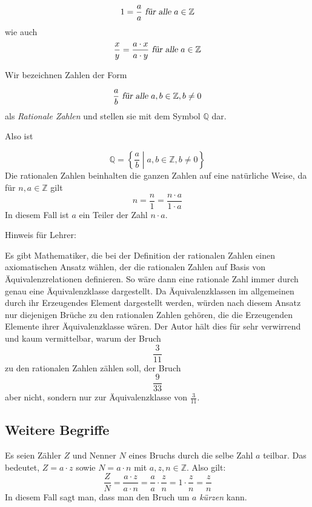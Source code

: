 \[ 1 = \frac{a}{a} \textsl{ für alle } a\in \mathbb{Z} \]
wie auch 
\begin{equation}
\label{relation}
\frac{x}{y} = \frac{a\cdot x}{a\cdot y} \textsl{ für alle } a\in \mathbb{Z}
\end{equation}

\begin{definition}
Wir bezeichnen Zahlen der Form 

\[ \frac{a}{b} \textsl{ für alle } a,b \in \mathbb{Z}, b\ne 0\]
als \emph{Rationale Zahlen} und stellen sie mit dem Symbol $\mathbb{Q}$ dar. 
\end{definition}
Also ist 

\[ \mathbb{Q} = \left\{ \frac{a}{b} \middle\vert a,b \in \mathbb{Z}, b\ne 0 \right\} \]
Die rationalen Zahlen beinhalten die ganzen Zahlen auf eine natürliche Weise, da für $n,a\in \mathbb{Z}$ gilt
\[ n = \frac{n}{1} = \frac{n \cdot a}{1\cdot a}\]
In diesem Fall ist $a$ ein Teiler der Zahl $n\cdot a$. 

\bigskip

\begin{fancyquotes}
Hinweis für Lehrer:

Es gibt Mathematiker, die bei der Definition der rationalen Zahlen einen axiomatischen Ansatz wählen, der die rationalen Zahlen auf Basis von Äquivalenzrelationen definieren. So wäre dann eine rationale Zahl immer durch genau eine Äquivalenzklasse dargestellt. Da Äquivalenzklassen im allgemeinen durch ihr Erzeugendes Element dargestellt werden, würden nach diesem Ansatz nur diejenigen Brüche zu den rationalen Zahlen gehören, die die Erzeugenden Elemente ihrer Äquivalenzklasse wären. Der Autor hält dies für sehr verwirrend und kaum vermittelbar, warum der Bruch 
\[ \frac{3}{11}\]
zu den rationalen Zahlen zählen soll, der Bruch
\[ \frac{9}{33}\]
aber nicht, sondern nur zur Äquivalenzklasse von $\frac{3}{11}$.
\end{fancyquotes}

\subsection{Weitere Begriffe}

\begin{definition}
Es seien Zähler $Z$ und Nenner $N$ eines Bruchs durch die selbe Zahl $a$ teilbar. Das bedeutet, $Z=a\cdot z$ sowie $N=a\cdot n$ mit $a,z,n\in \mathbb{Z}$. Also gilt:
\[
\frac{Z}{N} = \frac{a\cdot z}{a\cdot n} = \frac{a}{a}\cdot \frac{z}{n} = 1\cdot \frac{z}{n} = \frac{z}{n}
\]
In diesem Fall sagt man, dass man den Bruch um $a$ \emph{kürzen} kann.
\end{definition}

